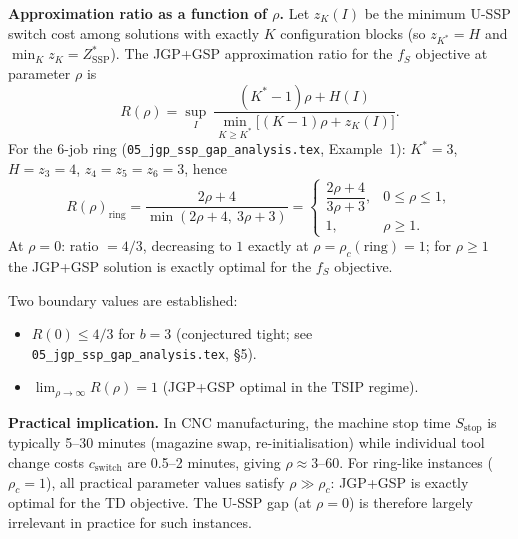 \documentclass[11pt,a4paper]{article}
\theoremstyle{plain}
\theoremstyle{definition}
\newcommand{\Kstar}{K^*}
\newcommand{\ZSSP}{Z_{\mathrm{SSP}}^*}
\begin{document}
\noindent\textbf{Approximation ratio as a function of $\rho$.}
Let $z_K(I)$ be the minimum U-SSP switch cost among solutions with exactly $K$
configuration blocks (so $z_{\Kstar}=H$ and $\min_K z_K=\ZSSP$). The JGP+GSP
approximation ratio for the $f_S$ objective at parameter $\rho$ is
\[
  R(\rho) = \sup_I\
  \frac{(\Kstar-1)\rho + H(I)}{\min_{K\ge\Kstar}\bigl[(K-1)\rho + z_K(I)\bigr]} .
\]
For the 6-job ring (\texttt{05\_jgp\_ssp\_gap\_analysis.tex}, Example~1):
$\Kstar=3$, $H=z_3=4$, $z_4=z_5=z_6=3$, hence
\[
  R(\rho)_{\text{ring}} = \frac{2\rho + 4}{\min(2\rho+4,\ 3\rho + 3)}
  = \begin{cases} \dfrac{2\rho+4}{3\rho+3}, & 0\le\rho\le1,\\[2pt]
     1, & \rho\ge 1.\end{cases}
\]
At $\rho=0$: ratio $=4/3$, decreasing to $1$ exactly at $\rho=\rho_c(\text{ring})=1$;
for $\rho \ge 1$ the JGP+GSP solution is exactly optimal for the $f_S$ objective.

\medskip
Two boundary values are established:
\begin{itemize}
\item $R(0) \leq 4/3$ for $b=3$ (conjectured tight; see
  \texttt{05\_jgp\_ssp\_gap\_analysis.tex}, \S5).
\item $\lim_{\rho \to \infty} R(\rho) = 1$ (JGP+GSP optimal in the TSIP regime).
\end{itemize}

\noindent\textbf{Practical implication.}
In CNC manufacturing, the machine stop time $S_\mathrm{stop}$ is typically
5--30 minutes (magazine swap, re-initialisation) while individual tool change
costs $c_\mathrm{switch}$ are 0.5--2 minutes, giving $\rho \approx 3$--60.
For ring-like instances ($\rho_c=1$), all practical parameter values satisfy
$\rho \gg \rho_c$: JGP+GSP is exactly optimal for the TD objective.
The U-SSP gap (at $\rho=0$) is therefore largely irrelevant in practice for
such instances.
\end{document}
